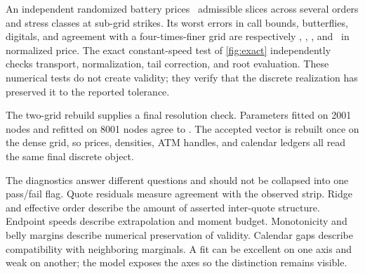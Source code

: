 An independent randomized battery prices \MacAuditSliceCount\ admissible
slices across several orders and stress classes at sub-grid strikes.  Its
worst errors in call bounds, butterflies, digitals, and agreement with a
four-times-finer grid are respectively
\MacAuditBoundsWorst, \MacAuditFlyWorst, \MacAuditDigitalWorst, and
\MacAuditGridAgreeWorst\ in normalized price.  The exact constant-speed test
of \cref{fig:exact} independently checks transport, normalization, tail
correction, and root evaluation.  These numerical tests do not create
validity; they verify that the discrete realization has preserved it to the
reported tolerance.

The two-grid rebuild supplies a final resolution check.  Parameters fitted on
2001 nodes and refitted on 8001 nodes agree to \MacTwoGridParamAgree.  The
accepted vector is rebuilt once on the dense grid, so prices, densities, ATM
handles, and calendar ledgers all read the same final discrete object.

The diagnostics answer different questions and should not be collapsed into
one pass/fail flag.  Quote residuals measure agreement with the observed
strip.  Ridge and effective order describe the amount of asserted
inter-quote structure.  Endpoint speeds describe extrapolation and moment
budget.  Monotonicity and belly margins describe numerical preservation of
validity.  Calendar gaps describe compatibility with neighboring marginals.
A fit can be excellent on one axis and weak on another; the model exposes the
axes so the distinction remains visible.
